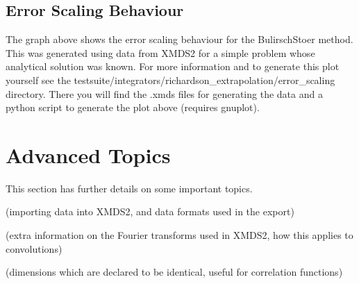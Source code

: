 \documentclass[letterpaper,10pt,english]{sphinxmanual}
\let\sphinxpxdimen\pdfpxdimen\else\newdimen\sphinxpxdimen
\begin{document}
\ignorespaces 

\section{Error Scaling Behaviour}
\label{\detokenize{bulirschStoer:error-scaling-behaviour}}\label{\detokenize{bulirschStoer:errorscaling}}\label{\detokenize{bulirschStoer:index-2}}
\noindent{\hspace*{\fill}\sphinxincludegraphics[width=800\sphinxpxdimen,height=600\sphinxpxdimen]{{error_scaling}.png}\hspace*{\fill}}

\sphinxAtStartPar
The graph above shows the error scaling behaviour for the Bulirsch\sphinxhyphen{}Stoer method. This was generated using data from XMDS2 for a simple problem whose analytical solution was known. For more information and to generate this plot yourself see the testsuite/integrators/richardson\_extrapolation/error\_scaling directory. There you will find the .xmds files for generating the data and a python script to generate the plot above (requires gnuplot).

\ignorespaces 

\chapter{Advanced Topics}
\label{\detokenize{advanced_topics:advanced-topics}}\label{\detokenize{advanced_topics:advancedtopics}}\label{\detokenize{advanced_topics:index-0}}\label{\detokenize{advanced_topics::doc}}
\sphinxAtStartPar
This section has further details on some important topics.

\sphinxAtStartPar
{\hyperref[\detokenize{advanced_topics:importing}]{}} (importing data into XMDS2, and data formats used in the export)

\sphinxAtStartPar
{\hyperref[\detokenize{advanced_topics:convolutions}]{}} (extra information on the Fourier transforms used in XMDS2, how this applies to convolutions)

\sphinxAtStartPar
{\hyperref[\detokenize{advanced_topics:dimensionaliases}]{}} (dimensions which are declared to be identical, useful for correlation functions)
\end{document}
